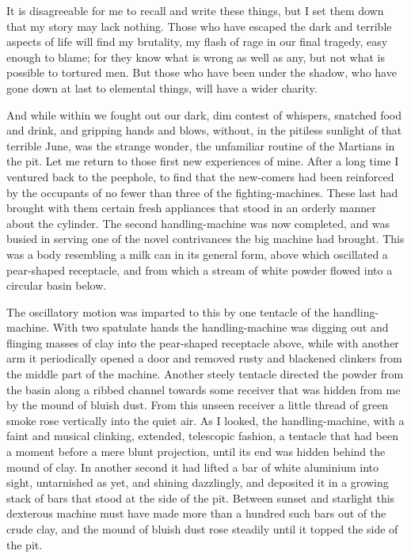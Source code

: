 It is disagreeable for me to recall and write these things, but I set them down that my story may lack nothing. Those who have escaped the dark and terrible aspects of life will find my brutality, my flash of rage in our final tragedy, easy enough to blame; for they know what is wrong as well as any, but not what is possible to tortured men. But those who have been under the shadow, who have gone down at last to elemental things, will have a wider charity.

And while within we fought out our dark, dim contest of whispers, snatched food and drink, and gripping hands and blows, without, in the pitiless sunlight of that terrible June, was the strange wonder, the unfamiliar routine of the Martians in the pit. Let me return to those first new experiences of mine. After a long time I ventured back to the peephole, to find that the new-comers had been reinforced by the occupants of no fewer than three of the fighting-machines. These last had brought with them certain fresh appliances that stood in an orderly manner about the cylinder. The second handling-machine was now completed, and was busied in serving one of the novel contrivances the big machine had brought. This was a body resembling a milk can in its general form, above which oscillated a pear-shaped receptacle, and from which a stream of white powder flowed into a circular basin below.

The oscillatory motion was imparted to this by one tentacle of the handling-machine. With two spatulate hands the handling-machine was digging out and flinging masses of clay into the pear-shaped receptacle above, while with another arm it periodically opened a door and removed rusty and blackened clinkers from the middle part of the machine. Another steely tentacle directed the powder from the basin along a ribbed channel towards some receiver that was hidden from me by the mound of bluish dust. From this unseen receiver a little thread of green smoke rose vertically into the quiet air. As I looked, the handling-machine, with a faint and musical clinking, extended, telescopic fashion, a tentacle that had been a moment before a mere blunt projection, until its end was hidden behind the mound of clay. In another second it had lifted a bar of white aluminium into sight, untarnished as yet, and shining dazzlingly, and deposited it in a growing stack of bars that stood at the side of the pit. Between sunset and starlight this dexterous machine must have made more than a hundred such bars out of the crude clay, and the mound of bluish dust rose steadily until it topped the side of the pit.

